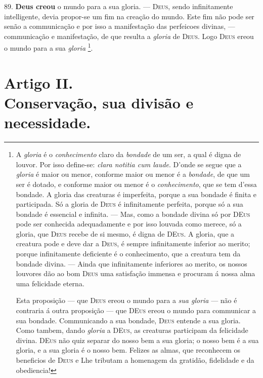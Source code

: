  89. \textbf{Deus creou} o mundo para a sua gloria. --- \textsc{Deus}, sendo infinitamente intelligente, devia propor-se um fim na creação do mundo. Este fim não pode ser senão a communicação e por isso a manifestação das perfeicoes divinas, --- communicação e manifestação, de que resulta a \emph{gloria} de \textsc{Deus}. Logo \textsc{Deus} ereou o mundo para a sua \emph{gloria} \footnote{A \emph{gloria} é o \emph{conhecimento} claro da \emph{bondade} de um ser, a qual é digna de louvor. Por isso define-se: \emph{clara notitia cum laude}. D'onde se segue que a \emph{gloria} é maior ou menor, conforme maior ou menor é a \emph{bondade}, de que um ser é dotado, e conforme maior ou menor é o \emph{conhecimento}, que se tem d'essa bondade. A gloria das creaturas é imperfeita, porque a sua bondade é finita e participada. Só a gloria de \textsc{Deus} é infinitamente perfeita, porque só a sua bondade é essencial e infinita. --- Mas, como a bondade divina só por \textsc{DEus} pode ser conhecida adequadamente e por isso louvada como merece, só a gloria, que \textsc{Deus} recebe de si mesmo, é digna de \textsc{DEus}. A gloria, que a creatura pode e deve dar a \textsc{Deus}, é sempre infinitamente inferior ao merito; porque infinitamente deficiente é o conhecimento, que a creatura tem da bondade divina. --- Ainda que infinitamente inferiores ao merito, os nossos louvores dão ao bom \textsc{Deus} uma satisfação immensa e procuram á nossa alma uma felicidade eterna.\par Esta proposição --- que \textsc{Deus} ereou o mundo para a \emph{sua gloria} --- não é contraria á outra proposição --- que \textsc{DEus} ereou o mundo para communicar a sua bondade. Communicando a sua bondade, \textsc{Deus} entende a sua gloria. Como tambem, dando \emph{gloria} a \textsc{DEus}, as creaturas participam da felicidade divina. \textsc{DEus} não quiz separar do nosso bem a sua gloria; o nosso bem é a sua gloria, e a sua gloria é o nosso bem. Felizes as almas, que reconhecem os beneficios de \textsc{Deus} e Lhe tributam a homenagem da gratidão, fidelidade e da obediencia!}.


\section*{Artigo II.\\ Conservação, sua divisão e necessidade.}

